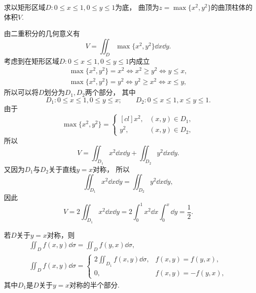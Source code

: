 \begin{example}
求以矩形区域\(D: 0 \leq x \leq 1,0 \leq y \leq 1\)为底，
曲顶为\(z = \max\{x^2,y^2\}\)的曲顶柱体的体积\(V\).
\begin{solution}
由二重积分的几何意义有\begin{equation*}
	V = \iint_D \max\{x^2,y^2\} \dd{x}\dd{y}.
\end{equation*}
考虑到在矩形区域\(D: 0 \leq x \leq 1,0 \leq y \leq 1\)内成立\begin{gather*}
	\max\{x^2,y^2\} = x^2
	\iff
	x^2 \geq y^2
	\iff
	y \leq x, \\
	\max\{x^2,y^2\} = y^2
	\iff
	y^2 \geq x^2
	\iff
	x \leq y,
\end{gather*}
所以可以将\(D\)划分为\(D_1,D_2\)两个部分，
其中\begin{equation*}
	D_1: 0 \leq x \leq 1,0 \leq y \leq x;
	\qquad
	D_2: 0 \leq x \leq 1,x \leq y \leq 1.
\end{equation*}
由于\begin{equation*}
	\max\{x^2,y^2\}
	= \begin{cases}[cl]
		x^2, & (x,y) \in D_1, \\
		y^2, & (x,y) \in D_2,
	\end{cases}
\end{equation*}
所以\begin{equation*}
	V
	= \iint_{D_1} x^2 \dd{x}\dd{y}
	+ \iint_{D_2} y^2 \dd{x}\dd{y}.
\end{equation*}
又因为\(D_1\)与\(D_2\)关于直线\(y=x\)对称，
所以\begin{equation*}
	\iint_{D_1} x^2 \dd{x}\dd{y}
	= \iint_{D_2} y^2 \dd{x}\dd{y},
\end{equation*}
因此\begin{equation*}
	V = 2 \iint_{D_1} x^2 \dd{x}\dd{y}
	= 2 \int_0^1 x^2 \dd{x} \int_0^x \dd{y}
	= \frac12.
\end{equation*}
\end{solution}
\end{example}

若\(D\)关于\(y=x\)对称，则\begin{gather*}
	\iint_D f(x,y) \dd{\sigma} = \iint_D f(y,x) \dd{\sigma}, \\
	\iint_D f(x,y) \dd{\sigma}
	= \left\{ \begin{array}{cc}
		2 \iint_{D_1} f(x,y) \dd{\sigma}, & f(x,y) = f(y,x), \\
		0, & f(x,y) = -f(y,x),
	\end{array} \right.
\end{gather*}
其中\(D_1\)是\(D\)关于\(y=x\)对称的半个部分.

